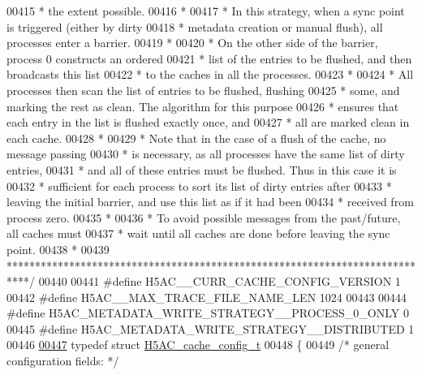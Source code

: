 \begin{DoxyCode}
00415 \textcolor{comment}{ *  the extent possible.}
00416 \textcolor{comment}{ *}
00417 \textcolor{comment}{ *  In this strategy, when a sync point is triggered (either by dirty}
00418 \textcolor{comment}{ *  metadata creation or manual flush), all processes enter a barrier.}
00419 \textcolor{comment}{ *}
00420 \textcolor{comment}{ *  On the other side of the barrier, process 0 constructs an ordered}
00421 \textcolor{comment}{ *  list of the entries to be flushed, and then broadcasts this list}
00422 \textcolor{comment}{ *  to the caches in all the processes.}
00423 \textcolor{comment}{ *}
00424 \textcolor{comment}{ *  All processes then scan the list of entries to be flushed, flushing}
00425 \textcolor{comment}{ *  some, and marking the rest as clean.  The algorithm for this purpose}
00426 \textcolor{comment}{ *  ensures that each entry in the list is flushed exactly once, and }
00427 \textcolor{comment}{ *  all are marked clean in each cache.}
00428 \textcolor{comment}{ *}
00429 \textcolor{comment}{ *  Note that in the case of a flush of the cache, no message passing}
00430 \textcolor{comment}{ *  is necessary, as all processes have the same list of dirty entries, }
00431 \textcolor{comment}{ *  and all of these entries must be flushed.  Thus in this case it is }
00432 \textcolor{comment}{ *  sufficient for each process to sort its list of dirty entries after }
00433 \textcolor{comment}{ *  leaving the initial barrier, and use this list as if it had been }
00434 \textcolor{comment}{ *  received from process zero.}
00435 \textcolor{comment}{ *}
00436 \textcolor{comment}{ *  To avoid possible messages from the past/future, all caches must}
00437 \textcolor{comment}{ *  wait until all caches are done before leaving the sync point.}
00438 \textcolor{comment}{ *      }
00439 \textcolor{comment}{ ****************************************************************************/}
00440 
00441 \textcolor{preprocessor}{#define H5AC\_\_CURR\_CACHE\_CONFIG\_VERSION     1}
00442 \textcolor{preprocessor}{#define H5AC\_\_MAX\_TRACE\_FILE\_NAME\_LEN       1024}
00443 
00444 \textcolor{preprocessor}{#define H5AC\_METADATA\_WRITE\_STRATEGY\_\_PROCESS\_0\_ONLY    0}
00445 \textcolor{preprocessor}{#define H5AC\_METADATA\_WRITE\_STRATEGY\_\_DISTRIBUTED       1}
00446 
\hyperlink{struct_h5_a_c__cache__config__t}{00447} \textcolor{keyword}{typedef} \textcolor{keyword}{struct }\hyperlink{struct_h5_a_c__cache__config__t}{H5AC\_cache\_config\_t}
00448 \{
00449     \textcolor{comment}{/* general configuration fields: */}

\end{DoxyCode}
